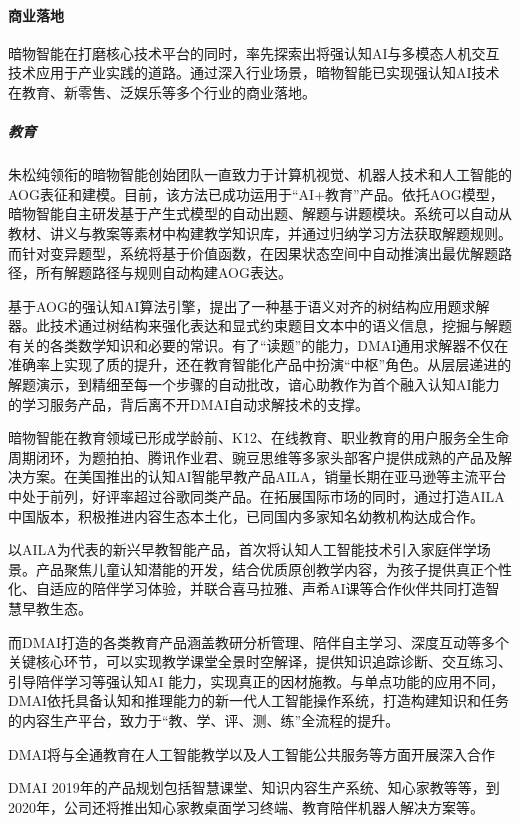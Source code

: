 \documentclass[letterpaper,11pt,english]{sphinxmanual}
\begin{document}
\paragraph{商业落地}
\label{\detokenize{chapter_company/dm-ai:id8}}
暗物智能在打磨核心技术平台的同时，率先探索出将强认知AI与多模态人机交互技术应用于产业实践的道路。通过深入行业场景，暗物智能已实现强认知AI技术在教育、新零售、泛娱乐等多个行业的商业落地。


\subparagraph{教育}
\label{\detokenize{chapter_company/dm-ai:id9}}
朱松纯领衔的暗物智能创始团队一直致力于计算机视觉、机器人技术和人工智能的AOG表征和建模。目前，该方法已成功运用于“AI+教育”产品。依托AOG模型，暗物智能自主研发基于产生式模型的自动出题、解题与讲题模块。系统可以自动从教材、讲义与教案等素材中构建教学知识库，并通过归纳学习方法获取解题规则。而针对变异题型，系统将基于价值函数，在因果状态空间中自动推演出最优解题路径，所有解题路径与规则自动构建AOG表达。

基于AOG的强认知AI算法引擎，提出了一种基于语义对齐的树结构应用题求解器。此技术通过树结构来强化表达和显式约束题目文本中的语义信息，挖掘与解题有关的各类数学知识和必要的常识。有了“读题”的能力，DMAI通用求解器不仅在准确率上实现了质的提升，还在教育智能化产品中扮演“中枢”角色。从层层递进的解题演示，到精细至每一个步骤的自动批改，谙心助教作为首个融入认知AI能力的学习服务产品，背后离不开DMAI自动求解技术的支撑。

暗物智能在教育领域已形成学龄前、K12、在线教育、职业教育的用户服务全生命周期闭环，为题拍拍、腾讯作业君、豌豆思维等多家头部客户提供成熟的产品及解决方案。在美国推出的认知AI智能早教产品AILA，销量长期在亚马逊等主流平台中处于前列，好评率超过谷歌同类产品。在拓展国际市场的同时，通过打造AILA中国版本，积极推进内容生态本土化，已同国内多家知名幼教机构达成合作。

以AILA为代表的新兴早教智能产品，首次将认知人工智能技术引入家庭伴学场景。产品聚焦儿童认知潜能的开发，结合优质原创教学内容，为孩子提供真正个性化、自适应的陪伴学习体验，并联合喜马拉雅、声希AI课等合作伙伴共同打造智慧早教生态。

而DMAI打造的各类教育产品涵盖教研分析管理、陪伴自主学习、深度互动等多个关键核心环节，可以实现教学课堂全景时空解译，提供知识追踪诊断、交互练习、引导陪伴学习等强认知AI
能力，实现真正的因材施教。与单点功能的应用不同，DMAI依托具备认知和推理能力的新一代人工智能操作系统，打造构建知识和任务的内容生产平台，致力于“教、学、评、测、练”全流程的提升。

DMAI将与全通教育在人工智能教学以及人工智能公共服务等方面开展深入合作

DMAI
2019年的产品规划包括智慧课堂、知识内容生产系统、知心家教等等，到2020年，公司还将推出知心家教桌面学习终端、教育陪伴机器人解决方案等。
\end{document}
